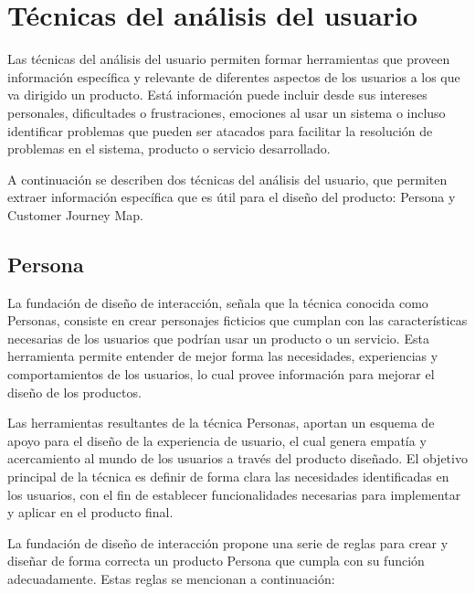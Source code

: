 
\section{Técnicas del análisis del usuario}
\label{TecnicasAnalisisCap3}

Las técnicas del análisis del usuario permiten formar herramientas que proveen información específica y relevante de diferentes aspectos de los usuarios a los que va dirigido un producto. Está información puede incluir desde sus intereses personales, dificultades o frustraciones, emociones al usar un sistema o incluso identificar problemas que pueden ser atacados para facilitar la resolución de problemas en el sistema, producto o servicio desarrollado.

A continuación se describen dos técnicas del análisis del usuario, que permiten extraer información específica que es útil para el diseño del producto: Persona y Customer Journey Map.


\subsection{Persona}
\label{PersonaCap3}

La fundación de diseño de interacción, señala que la técnica conocida como Personas, consiste en crear personajes ficticios que cumplan con las características necesarias de los usuarios que podrían usar un producto o un servicio. Esta herramienta permite entender de mejor forma las necesidades, experiencias y comportamientos de los usuarios, lo cual provee información para mejorar el diseño de los productos.

Las herramientas resultantes de la técnica Personas, aportan un esquema de apoyo para el diseño de la experiencia de usuario, el cual genera empatía y acercamiento al mundo de los usuarios a través del producto diseñado. El objetivo principal de la técnica es definir de forma clara las necesidades identificadas en los usuarios, con el fin de establecer funcionalidades necesarias para implementar y aplicar en el producto final.

La fundación de diseño de interacción propone una serie de reglas para crear y diseñar de forma correcta un producto Persona que cumpla con su función adecuadamente. Estas reglas se mencionan a continuación:

